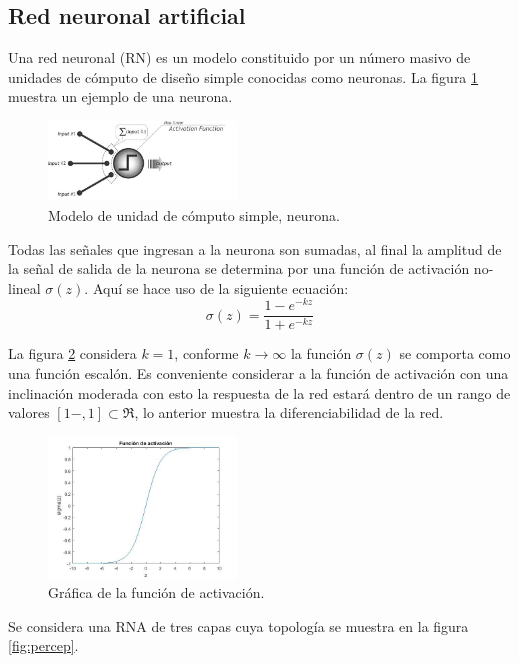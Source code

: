 \subsection{Red neuronal artificial}
Una red neuronal (RN) es un modelo constituido por un
n\'umero masivo de unidades de c\'omputo de dise\~no simple
conocidas como neuronas. La figura \ref{fig:neurona}  muestra un ejemplo
de una neurona.

\begin{figure}[H]
	\centering
	\includegraphics[width=5cm]{img/neurona.jpg}
	\caption{Modelo de unidad de c\'omputo simple, neurona.}
	\label{fig:neurona}
\end{figure}

Todas las se\~nales que ingresan a la neurona son sumadas,
al final la amplitud de la se\~nal de salida de la neurona se
determina por una funci\'on de activaci\'on no-lineal $\sigma(z)$. Aqu\'i
se hace uso de la siguiente ecuaci\'on: 
\begin{equation}
	\sigma(z)=\frac{1-e^{-kz}}{1+e^{-kz}}
\end{equation}

La figura \ref{fig:activa} considera $k=1$, conforme $k\rightarrow\infty$ la funci\'on
$\sigma(z)$ se comporta como una funci\'on escal\'on. Es conveniente
considerar a la funci\'on de activaci\'on con una inclinaci\'on
moderada con esto la respuesta de la red estar\'a dentro de un
rango de valores $\left[1-,1\right]\subset\Re$, lo anterior muestra la diferenciabilidad
de la red.

\begin{figure}[H]
	\centering
	\includegraphics[width=5cm]{img/activa.jpg}
	\caption{Gr\'afica de  la funci\'on de activaci\'on.}
	\label{fig:activa}
\end{figure}

Se considera una RNA de tres capas cuya topolog\'ia se
muestra en la figura \ref{fig:percep}.  

